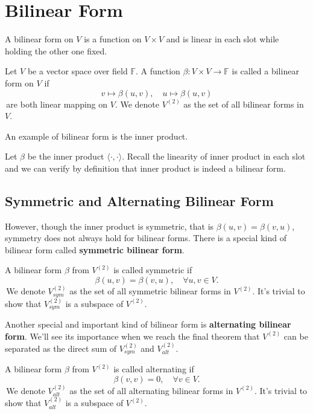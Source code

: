 \section{Bilinear Form}
A bilinear form on $V$ is a function on $V\times V$ and is linear in each slot while holding the other one fixed.
\begin{definition}
    Let $V$ be a vector space over field $\mathbb{F}$. A function $\beta: V\times V \to \mathbb{F}$ is called a bilinear form on $V$ if 
    $$v \mapsto \beta(u,v), \quad u \mapsto \beta(u,v)$$
    \,are both linear mapping on $V$. We denote $V^{(2)}$ as the set of all bilinear forms in $V$.
\end{definition}

An example of bilinear form is the inner product. 
\begin{example}
    Let $\beta$ be the inner product $\langle \cdot, \cdot \rangle$. Recall the linearity of inner product in each slot and we can verify by definition that inner product is indeed a bilinear form.
\end{example}

\subsection{Symmetric and Alternating Bilinear Form}
However, though the inner product is symmetric, that is $\beta(u,v) = \beta(v,u)$, symmetry does not always hold for bilinear forms. There is a special kind of bilinear form called \textbf{symmetric bilinear form}.
\begin{definition}
    A bilinear form $\beta$ from $V^{(2)}$ is called symmetric if 
    $$\beta(u,v) = \beta(v,u), \quad \forall u,v \in V.$$
    \,We denote $V_{sym}^{(2)}$ as the set of all symmetric bilinear forms in $V^{(2)}$. It's trivial to show that $V_{sym}^{(2)}$ is a subspace of $V^{(2)}$.
\end{definition}

Another special and important kind of bilinear form is \textbf{alternating bilinear form}. We'll see its importance when we reach the final theorem that $V^{(2)}$ can be separated as the direct sum
of $V_{sym}^{(2)}$ and $V_{alt}^{(2)}$.
\begin{definition}
    A bilinear form $\beta$ from $V^{(2)}$ is called alternating if 
    $$\beta(v,v) = 0, \quad \forall v \in V.$$
    \,We denote $V_{alt}^{(2)}$ as the set of all alternating bilinear forms in $V^{(2)}$. It's trivial to show that $V_{alt}^{(2)}$ is a subspace of $V^{(2)}$.
\end{definition}

